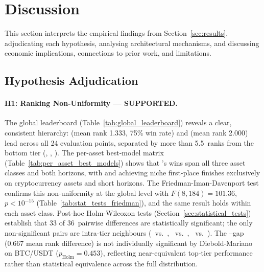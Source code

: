 \section{Discussion}
\label{sec:discussion}

This section interprets the empirical findings from Section~\ref{sec:results}, adjudicating each hypothesis, analysing architectural mechanisms, and discussing economic implications, connections to prior work, and limitations.

\subsection{Hypothesis Adjudication}
\label{sec:hypothesis_adjudication}

\paragraph{H1: Ranking Non-Uniformity --- SUPPORTED.}
The global leaderboard (Table~\ref{tab:global_leaderboard}) reveals a clear, consistent hierarchy: \moderntcn (mean rank 1.333, 75\% win rate) and \patchtst (mean rank 2.000) lead across all 24 evaluation points, separated by more than 5.5~ranks from the bottom tier (\timesnet, \autoformer, \lstm).  The per-asset best-model matrix (Table~\ref{tab:per_asset_best_models}) shows that \moderntcn's wins span all three asset classes and both horizons, with \nhits and \patchtst achieving niche first-place finishes exclusively on cryptocurrency assets and short horizons.  The Friedman-Iman-Davenport test confirms this non-uniformity at the global level with $F(8,184) = 101.36$, $p < 10^{-15}$ (Table~\ref{tab:stat_tests_friedman}), and the same result holds within each asset class.  Post-hoc Holm-Wilcoxon tests (Section~\ref{sec:statistical_tests}) establish that 33 of 36~pairwise differences are statistically significant; the only non-significant pairs are intra-tier neighbours (\timexer~vs.~\itransformer, \autoformer~vs.~\timesnet, \dlinear~vs.~\nhits).  The \moderntcn--\patchtst gap (0.667 mean rank difference) is not individually significant by Diebold-Mariano on BTC/USDT ($p_\text{Holm} = 0.453$), reflecting near-equivalent top-tier performance rather than statistical equivalence across the full distribution.


